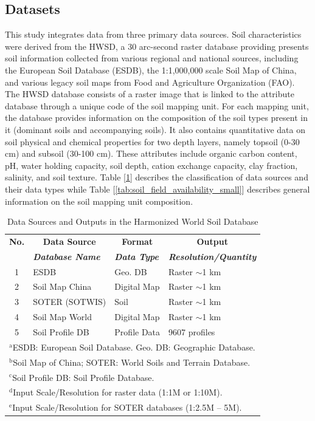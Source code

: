 \subsection{Datasets}
This study integrates data from three primary data sources. Soil characteristics were derived from the HWSD, a 30 arc-second raster database providing presents soil information collected from various regional and national sources, including the European Soil Database (ESDB), the 1:1,000,000 scale Soil Map of China, and various legacy soil maps from Food and Agriculture Organization (FAO). The HWSD database consists of a raster image that is linked to the attribute database through a unique code of the soil mapping unit. For each mapping unit, the database provides information on the composition of the soil types present in it (dominant soils and accompanying soils). It also contains quantitative data on soil physical and chemical properties for two depth layers, namely topsoil (0-30 cm) and subsoil (30-100 cm). These attributes include organic carbon content, pH, water holding capacity, soil depth, cation exchange capacity, clay fraction, salinity, and soil texture. Table [\ref{tab:hwsd_sources_compact}] describes the classification of data sources and their data types while Table [\ref{tab:soil_field_availability_small}] describes general information on the soil mapping unit composition.

\begin{table}[H]
\caption{Data Sources and Outputs in the Harmonized World Soil Database}
\centering
\begin{tabular}{|c|l|l|l|} %
\hline
\textbf{No.} & \multicolumn{1}{|c|}{\textbf{Data Source}} & \multicolumn{1}{|c|}{\textbf{Format}} & \multicolumn{1}{|c|}{\textbf{Output}} \\
\cline{2-4} %
\textbf{} & \textbf{\textit{Database Name}} & \textbf{\textit{Data Type}} & \textbf{\textit{Resolution/Quantity}} \\
\hline
1 & ESDB & Geo. DB & Raster $\sim$1 km \\
\hline
2 & Soil Map China & Digital Map & Raster $\sim$1 km \\
\hline
3 & SOTER (SOTWIS) & Soil & Raster $\sim$1 km \\
\hline
4 & Soil Map World & Digital Map & Raster $\sim$1 km \\
\hline
5 & Soil Profile DB & Profile Data & 9607 profiles \\
\hline
\multicolumn{4}{l}{$^{\mathrm{a}}$ESDB: European Soil Database. Geo. DB: Geographic Database.} \\
\multicolumn{4}{l}{$^{\mathrm{b}}$Soil Map of China; SOTER: World Soils and Terrain Database.} \\
\multicolumn{4}{l}{$^{\mathrm{c}}$Soil Profile DB: Soil Profile Database.} \\
\multicolumn{4}{l}{$^{\mathrm{d}}$Input Scale/Resolution for raster data (1:1M or 1:10M).} \\
\multicolumn{4}{l}{$^{\mathrm{e}}$Input Scale/Resolution for SOTER databases (1:2.5M – 5M).}
\end{tabular}
\label{tab:hwsd_sources_compact}
\end{table}

